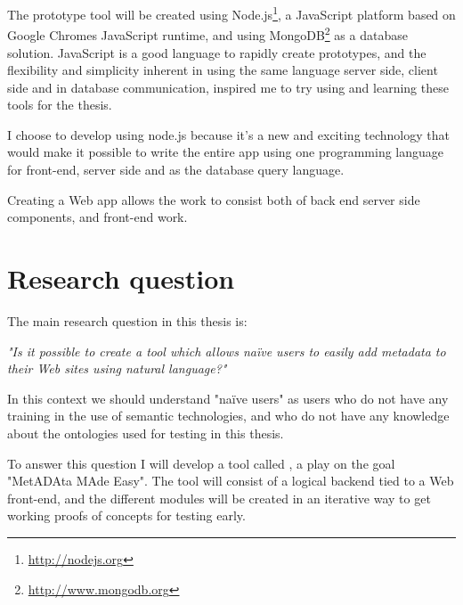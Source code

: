 The prototype tool will be created using Node.js\footnote{\url{http://nodejs.org}},
a JavaScript platform based on Google Chromes JavaScript runtime,
and using MongoDB\footnote{\url{http://www.mongodb.org}} as a database solution.
JavaScript is a good language to rapidly create prototypes, and the flexibility and simplicity inherent in using the same language
server side, client side and in database communication, inspired me to try using and learning these tools for the thesis.

%

I choose to develop using node.js because it's a new and exciting technology that would make it possible to write
the entire app using one programming language for front-end, server side and as the database query language.

Creating a Web app allows the work to consist both of back end server side components, and front-end work.


\section{Research question}
The main research question in this thesis is:

\emph{"Is it possible to create a tool which allows naïve users to easily add metadata to their Web sites using natural language?"}

In this context we should understand "naïve users" as users who do not have any training in the use of semantic technologies,
and who do not have any knowledge about the ontologies used for testing in this thesis.

To answer this question I will develop a tool called \theartefact, a play on the goal "MetADAta MAde Easy".
The tool will consist of a logical backend tied to a Web front-end,
and the different modules will be created in an iterative way to get working proofs of concepts for testing early.

